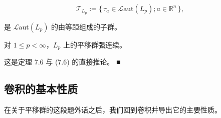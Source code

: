 \[
\mathcal{T}_{L_{p}} := \{\, \tau_{a} \in \mathcal{L}\mathrm{aut}(L_{p}) ; a \in \mathbb{R}^{n} \,\} ,
\]

是 $ \mathcal{L}\mathrm{aut}(L_{p}) $ 的由等距组成的子群。

\begin{corollary}

对 $ 1 \le p < \infty $，$ L_{p} $ 上的平移群强连续。

\proofhead
这是定理 7.6 与 (7.6) 的直接推论。 \nobreak\hspace{0.35em}■
\end{corollary}

\subsection*{卷积的基本性质}

在关于平移群的这段题外话之后，我们回到卷积并导出它的主要性质。

